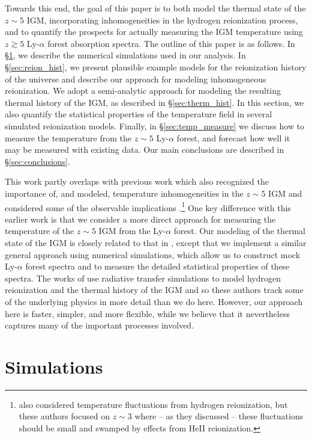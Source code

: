 Towards this end, the goal of this paper is to both model the thermal state of the $z \sim 5$ IGM, incorporating inhomogeneities in
the hydrogen reionization process, and to quantify the prospects for actually measuring the IGM temperature using $z \gtrsim 5$ Ly-$\alpha$ forest absorption spectra. The outline of this paper is as follows. In \S \ref{sec:sims}, we describe
the numerical simulations used in our analysis. In \S \ref{sec:reion_hist}, we present plausible example models for
the reionization history of the universe and describe our approach for modeling inhomogeneous reionization. We adopt a semi-analytic approach
for modeling the resulting thermal history of the IGM, as described in \S \ref{sec:therm_hist}. In this section, we also quantify
the statistical properties of the temperature field in several simulated reionization models.
 Finally, in \S \ref{sec:temp_measure} we discuss how to measure
the temperature from the $z \sim 5$ Ly-$\alpha$ forest, and forecast how well it may be measured with existing data. Our main conclusions
are described in \S \ref{sec:conclusions}.

This work partly overlaps with previous work which also recognized the importance of, and modeled, temperature inhomogeneities in the $z \sim 5$ IGM
and considered some of the observable implications \citep{Trac:2008yz,Cen:2009bg,Furlanetto:2009kr}.\footnote{\citet{Lai:2005ha} also considered
temperature fluctuations from hydrogen reionization, but these authors focused on $z \sim 3$ where -- as they discussed -- these fluctuations should be small and swamped
by effects from HeII reionization.} One key difference with this earlier work is
that we consider a more direct approach for measuring the temperature of the $z \sim 5$ IGM from the Ly-$\alpha$ forest. Our modeling of
the thermal state of the IGM is closely related to that in \citet{Furlanetto:2009kr}, except that we implement a similar general approach
using numerical simulations, which allow us to construct mock Ly-$\alpha$ forest spectra and to measure the detailed statistical properties
of these spectra. The works of \citep{Trac:2008yz,Cen:2009bg} use radiative transfer simulations to model hydrogen reionization and the
thermal history of the IGM and so these authors track
some of the underlying physics in more detail than we do here. However, our approach here is faster, simpler, and more flexible, while we believe
that it nevertheless captures many of the important processes involved. 


\section{Simulations}
\label{sec:sims}

